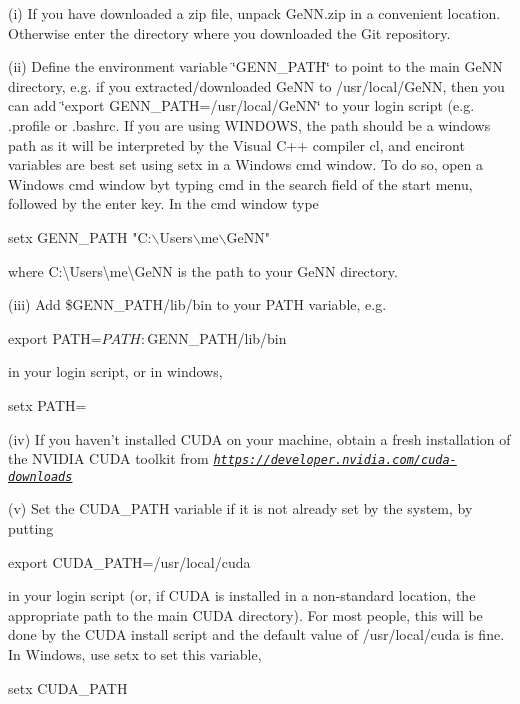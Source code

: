 (i) If you have downloaded a zip file, unpack Ge\+N\+N.\+zip in a convenient location. Otherwise enter the directory where you downloaded the Git repository.

(ii) Define the environment variable \char`\"{}\+G\+E\+N\+N\+\_\+\+P\+A\+T\+H\char`\"{} to point to the main Ge\+N\+N directory, e.\+g. if you extracted/downloaded Ge\+N\+N to /usr/local/\+Ge\+N\+N, then you can add \char`\"{}export
     G\+E\+N\+N\+\_\+\+P\+A\+T\+H=/usr/local/\+Ge\+N\+N\char`\"{} to your login script (e.\+g. {\ttfamily .profile} or {\ttfamily .bashrc}. If you are using W\+I\+N\+D\+O\+W\+S, the path should be a windows path as it will be interpreted by the Visual C++ compiler {\ttfamily cl}, and enciront variables are best set using {\ttfamily setx} in a Windows cmd window. To do so, open a Windows cmd window byt typing {\ttfamily cmd} in the search field of the start menu, followed by the {\ttfamily enter} key. In the {\ttfamily cmd} window type 
\begin{DoxyCode}
setx GENN\_PATH \textcolor{stringliteral}{"C:\(\backslash\)Users\(\backslash\)me\(\backslash\)GeNN"}
\end{DoxyCode}
 where {\ttfamily C\+:\textbackslash{}Users\textbackslash{}me\textbackslash{}Ge\+N\+N} is the path to your Ge\+N\+N directory.

(iii) Add \$\+G\+E\+N\+N\+\_\+\+P\+A\+T\+H/lib/bin to your P\+A\+T\+H variable, e.\+g. 
\begin{DoxyCode}
export PATH=$PATH:$GENN\_PATH/lib/bin
\end{DoxyCode}
 in your login script, or in windows, 
\begin{DoxyCode}
setx PATH=%
\end{DoxyCode}


(iv) If you haven't installed C\+U\+D\+A on your machine, obtain a fresh installation of the N\+V\+I\+D\+I\+A C\+U\+D\+A toolkit from {\itshape \href{https://developer.nvidia.com/cuda-downloads}{\tt https\+://developer.\+nvidia.\+com/cuda-\/downloads}} 

(v) Set the {\ttfamily C\+U\+D\+A\+\_\+\+P\+A\+T\+H} variable if it is not already set by the system, by putting 
\begin{DoxyCode}
export CUDA\_PATH=/usr/local/cuda
\end{DoxyCode}
 in your login script (or, if C\+U\+D\+A is installed in a non-\/standard location, the appropriate path to the main C\+U\+D\+A directory). For most people, this will be done by the C\+U\+D\+A install script and the default value of /usr/local/cuda is fine. In Windows, use {\ttfamily setx} to set this variable, 
\begin{DoxyCode}
setx CUDA\_PATH 
\end{DoxyCode}


